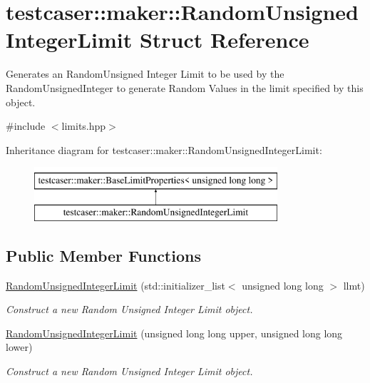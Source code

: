 \hypertarget{structtestcaser_1_1maker_1_1RandomUnsignedIntegerLimit}{}\section{testcaser\+:\+:maker\+:\+:Random\+Unsigned\+Integer\+Limit Struct Reference}
\label{structtestcaser_1_1maker_1_1RandomUnsignedIntegerLimit}


Generates an Random\+Unsigned Integer Limit to be used by the Random\+Unsigned\+Integer to generate Random Values in the limit specified by this object.  




{\ttfamily \#include $<$limits.\+hpp$>$}

Inheritance diagram for testcaser\+:\+:maker\+:\+:Random\+Unsigned\+Integer\+Limit\+:\begin{figure}[H]
\begin{center}
\leavevmode
\includegraphics[height=2.000000cm]{structtestcaser_1_1maker_1_1RandomUnsignedIntegerLimit}
\end{center}
\end{figure}
\subsection*{Public Member Functions}
\begin{DoxyCompactItemize}
\item 
\mbox{\hyperlink{structtestcaser_1_1maker_1_1RandomUnsignedIntegerLimit_a8535b952828f59d17c69caae62f4c4e1}{Random\+Unsigned\+Integer\+Limit}} (std\+::initializer\+\_\+list$<$ unsigned long long $>$ llmt)
\begin{DoxyCompactList}\small\item\em Construct a new Random Unsigned Integer Limit object. \end{DoxyCompactList}\item 
\mbox{\hyperlink{structtestcaser_1_1maker_1_1RandomUnsignedIntegerLimit_a4299cc026c1ed26b595c248c6e243f8c}{Random\+Unsigned\+Integer\+Limit}} (unsigned long long upper, unsigned long long lower)
\begin{DoxyCompactList}\small\item\em Construct a new Random Unsigned Integer Limit object. \end{DoxyCompactList}\end{DoxyCompactItemize}
